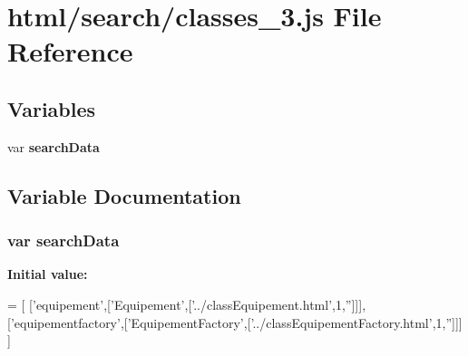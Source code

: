 \section{html/search/classes\-\_\-3.js File Reference}
\label{classes__3_8js}
\subsection*{Variables}
\begin{DoxyCompactItemize}
\item 
var {\bf search\-Data}
\end{DoxyCompactItemize}


\subsection{Variable Documentation}
\subsubsection[{search\-Data}]{\setlength{\rightskip}{0pt plus 5cm}var search\-Data}\label{classes__3_8js_ad01a7523f103d6242ef9b0451861231e}
{\bfseries Initial value\-:}
\begin{DoxyCode}
=
[
  [\textcolor{stringliteral}{'equipement'},[\textcolor{stringliteral}{'Equipement'},[\textcolor{stringliteral}{'../classEquipement.html'},1,\textcolor{stringliteral}{''}]]],
  [\textcolor{stringliteral}{'equipementfactory'},[\textcolor{stringliteral}{'EquipementFactory'},[\textcolor{stringliteral}{'../classEquipementFactory.html'},1,\textcolor{stringliteral}{''}]]]
]
\end{DoxyCode}
